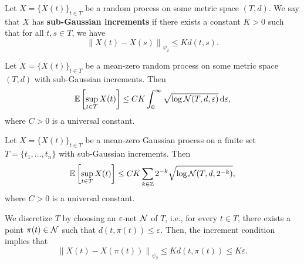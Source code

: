 \begin{definition}
	Let \(X=\{X(t)\}_{t\in T}\) be a random process on some metric space \((T,d)\). We say that \(X\) has \textbf{sub-Gaussian increments} if there exists a constant \(K>0\) such that for all \(t,s\in T\), we have
	\begin{equation*}
		\left\|X(t)-X(s)\right\|_{\psi_{2}}\leq Kd(t,s).
	\end{equation*}
\end{definition}

\begin{theorem}
	Let \(X=\{X(t)\}_{t\in T}\) be a mean-zero random process on some metric space \((T,d)\) with sub-Gaussian increments. Then
	\begin{equation*}
		\mathbb{E}\left[\sup_{t\in T}X(t)\right]\leq CK\int_{0}^{\infty}\sqrt{\log\mathcal{N}(T,d,\varepsilon)}\mathop{}\!\mathrm{d}\varepsilon,
	\end{equation*}
	where \(C>0\) is a universal constant.
\end{theorem}

\begin{theorem}
	Let \(X=\{X(t)\}_{t\in T}\) be a mean-zero Gaussian process on a finite set \(T=\{t_{1},\ldots,t_{n}\}\) with sub-Gaussian increments. Then
	\begin{equation*}
		\mathbb{E}\left[\sup_{t\in T}X(t)\right]\leq CK\sum_{k\in\mathbb{Z}}2^{-k}\sqrt{\log\mathcal{N}(T,d,2^{-k})},
	\end{equation*}
	where \(C>0\) is a universal constant.
\end{theorem}

We discretize \(T\) by choosing an \(\varepsilon\)-net \(\mathcal{N}\) of \(T\), i.e., for every \(t\in T\), there exists a point \(\pi(t)\in\mathcal{N}\) such that \(d(t,\pi(t))\leq\varepsilon\). Then, the increment condition implies that
\begin{equation*}
	\left\|X(t)-X(\pi(t))\right\|_{\psi_{2}}\leq Kd(t,\pi(t))\leq K\varepsilon.
\end{equation*}

